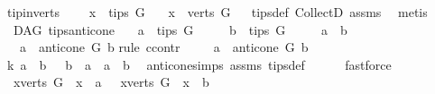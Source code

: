 \begin{isabellebody}
%
\isadelimproof
%
\endisadelimproof
\isanewline
\isanewline
{}\isamarkupfalse%
\ tip{\isacharunderscore}{\kern0pt}in{\isacharunderscore}{\kern0pt}verts{\isacharcolon}{\kern0pt}\ \isanewline
\ \ \ {\isachardoublequoteopen}x\ {\isasymin}\ tips\ G{\isachardoublequoteclose}\isanewline
\ \ \ {\isachardoublequoteopen}x\ {\isasymin}\ verts\ G{\isachardoublequoteclose}%
\isadelimproof
\ %
\endisadelimproof
%
\isatagproof
{}\isamarkupfalse%
\ tips{\isacharunderscore}{\kern0pt}def\ CollectD\ assms{\isacharparenleft}{\kern0pt}{}{\isacharparenright}{\kern0pt}\ \isamarkupfalse%
\ metis%
\endisatagproof
{\isafoldproof}%
%
\isadelimproof
%
\endisadelimproof
%
\isadelimdocument
%
\endisadelimdocument
%
\isatagdocument
%
\isamarkuptrue%
%
\endisatagdocument
{\isafolddocument}%
%
\isadelimdocument
%
\endisadelimdocument
{}\isamarkupfalse%
\ {\isacharparenleft}{\kern0pt}\ DAG{\isacharparenright}{\kern0pt}\ tips{\isacharunderscore}{\kern0pt}anticone{\isacharcolon}{\kern0pt}\isanewline
\ \ \ {\isachardoublequoteopen}a\ {\isasymin}\ tips\ G{\isachardoublequoteclose}\isanewline
\ \ \ \ \ {\isachardoublequoteopen}b\ {\isasymin}\ tips\ G{\isachardoublequoteclose}\isanewline
\ \ \ \ \ {\isachardoublequoteopen}a\ {\isasymnoteq}\ b{\isachardoublequoteclose}\isanewline
\ \ \ {\isachardoublequoteopen}a\ {\isasymin}\ anticone\ G\ b{\isachardoublequoteclose}\isanewline
%
\isadelimproof
%
\endisadelimproof
%
\isatagproof
{}\isamarkupfalse%
{\isacharparenleft}{\kern0pt}rule\ ccontr{\isacharparenright}{\kern0pt}\isanewline
\ \ \isamarkupfalse%
\ {\isachardoublequoteopen}\ a\ {\isasymnotin}\ anticone\ G\ b{\isachardoublequoteclose}\ \isanewline
\ \ \isamarkupfalse%
\ \isamarkupfalse%
\ k{\isacharcolon}{\kern0pt}\ {\isachardoublequoteopen}{\isacharparenleft}{\kern0pt}a\ {\isasymrightarrow}\isactrlsup {\isacharplus}{\kern0pt}\ b\ {\isasymor}\ \ b\ {\isasymrightarrow}\isactrlsup {\isacharplus}{\kern0pt}\ a\ {\isasymor}\ a\ {\isacharequal}{\kern0pt}\ b{\isacharparenright}{\kern0pt}{\isachardoublequoteclose}\ \isamarkupfalse%
\ anticone{\isachardot}{\kern0pt}simps\ assms\ tips{\isacharunderscore}{\kern0pt}def\isanewline
\ \ \ \ \isamarkupfalse%
\ fastforce\ \isanewline
\ \ \isamarkupfalse%
\ \isamarkupfalse%
\ {\isachardoublequoteopen}{\isasymnot}\ {\isacharparenleft}{\kern0pt}{\isasymforall}x{\isasymin}verts\ G{\isachardot}{\kern0pt}\ \ x\ {\isasymrightarrow}\isactrlsup {\isacharplus}{\kern0pt}\ a{\isacharparenright}{\kern0pt}\ {\isasymor}\ {\isasymnot}\ {\isacharparenleft}{\kern0pt}{\isasymforall}x{\isasymin}verts\ G{\isachardot}{\kern0pt}\ \ x\ {\isasymrightarrow}\isactrlsup {\isacharplus}{\kern0pt}\ b{\isacharparenright}{\kern0pt}{\isachardoublequoteclose}\ \isamarkupfalse%

\end{isabellebody}
